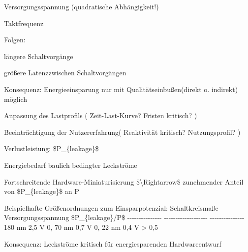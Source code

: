 \documentclass[a4paper]{article}
\begin{document}
\begin{multicols}{3}
\begin{itemize*}
\begin{enumerate*}
            \item Versorgungsspannung (quadratische Abhängigkeit!)
            \item Taktfrequenz
        \end{enumerate*}
        \item
        Folgen:
        \begin{enumerate*}

            \item längere Schaltvorgänge
            \item größere Latenzzwischen Schaltvorgängen
        \end{enumerate*}
        \item
        Konsequenz: Energieeinsparung nur mit Qualitätseinbußen(direkt o.
        indirekt) möglich
        \begin{itemize*}
            \item Anpassung des Lastprofils ( Zeit-Last-Kurve? Fristen kritisch? )
            \item Beeinträchtigung der Nutzererfahrung( Reaktivität kritisch? Nutzungsprofil? )
        \end{itemize*}
    \end{itemize*}

    Verlustleistung: \$P\_\{leakage\}\$

    \begin{itemize*}
        \item
        Energiebedarf baulich bedingter Leckströme
        \item
        Fortschreitende Hardware-Miniaturisierung
        \$\textbackslash Rightarrow\$ zunehmender Anteil von
        \$P\_\{leakage\}\$ an P
        \item
        Beispielhafte Größenordnungen zum Einsparpotenzial: \textbar{}
        Schaltkreismaße \textbar{} Versorgungsspannung \textbar{}
        \$P\_\{leakage\}/P\$ \textbar{} \textbar{}
        -\/-\/-\/-\/-\/-\/-\/-\/-\/-\/-\/-\/-\/-\/- \textbar{}
        -\/-\/-\/-\/-\/-\/-\/-\/-\/-\/-\/-\/-\/-\/-\/-\/-\/-\/- \textbar{}
        -\/-\/-\/-\/-\/-\/-\/-\/-\/-\/-\/-\/-\/-\/- \textbar{} \textbar{} 180
        nm \textbar{} 2,5 V \textbar{} 0, \textbar{} \textbar{} 70 nm
        \textbar{} 0,7 V \textbar{} 0, \textbar{} \textbar{} 22 nm \textbar{}
        0,4 V \textbar{} \textgreater{} 0,5 \textbar{}
        \item
        Konsequenz: Leckströme kritisch für energiesparenden Hardwareentwurf
    \end{itemize*}



\end{multicols}
\end{document}
